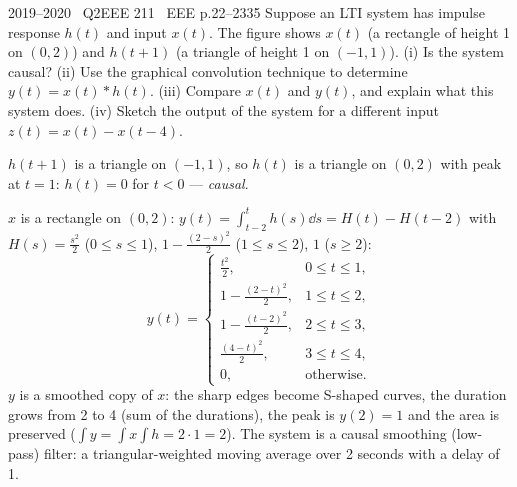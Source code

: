 \begin{qcard}{2019--2020 \textbullet\ Q2}{EEE 211 \textbullet\ EEE p.22--23}{35}
Suppose an LTI system has impulse response $h(t)$ and input $x(t)$. The figure shows $x(t)$ (a rectangle of height 1 on $(0,2)$) and $h(t+1)$ (a triangle of height 1 on $(-1,1)$).
(i) Is the system causal? (ii) Use the graphical convolution technique to determine $y(t)=x(t)*h(t)$. (iii) Compare $x(t)$ and $y(t)$, and explain what this system does. (iv) Sketch the output of the system for a different input $z(t)=x(t)-x(t-4)$.
\end{qcard}
\begin{solution}
 $h(t+1)$ is a triangle on $(-1,1)$, so $h(t)$ is a triangle on $(0,2)$ with peak at $t=1$: $h(t)=0$ for $t<0$ --- \emph{causal}.

 $x$ is a rectangle on $(0,2)$: $y(t)=\int_{t-2}^{t}h(s)\dd s=H(t)-H(t-2)$ with $H(s)=\frac{s^2}2$ ($0\le s\le1$), $1-\frac{(2-s)^2}{2}$ ($1\le s\le2$), $1$ ($s\ge2$):
\[
y(t)=\begin{cases}\frac{t^2}2,&0\le t\le1,\\1-\frac{(2-t)^2}2,&1\le t\le2,\\1-\frac{(t-2)^2}2,&2\le t\le3,\\\frac{(4-t)^2}2,&3\le t\le4,\\0,&\text{otherwise.}\end{cases}
\]
 $y$ is a smoothed copy of $x$: the sharp edges become S-shaped curves, the duration grows from 2 to 4 (sum of the durations), the peak is $y(2)=1$ and the area is preserved ($\int y=\int x\int h=2\cdot1=2$). The system is a causal smoothing (low-pass) filter: a triangular-weighted moving average over 2 seconds with a delay of 1.


\end{solution}
